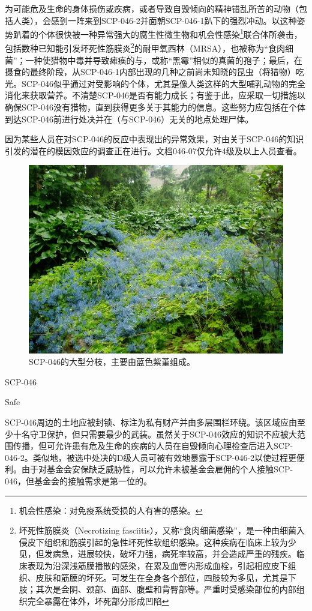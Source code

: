 为可能危及生命的身体损伤或疾病，或者导致自毁倾向的精神错乱所苦的动物（包括人类），会感到一阵来到SCP-046-2并面朝SCP-046-1趴下的强烈冲动。以这种姿势趴着的个体很快被一种异常强大的腐生性微生物和机会性感染\footnote{ 机会性感染：对免疫系统受损的人有害的感染。}联合体所袭击，包括数种已知能引发坏死性筋膜炎\footnote{ 坏死性筋膜炎（Necrotizing fasciitis），又称“食肉细菌感染”，是一种由细菌入侵皮下组织和筋膜引起的急性坏死性软组织感染。这种疾病在临床上较为少见，但发病急，进展较快，破坏力强，病死率较高，并会造成严重的残疾。临床表现为沿深浅筋膜播散的感染，在累及血管内形成血栓，引起相应皮下组织、皮肤和筋膜的坏死。可发生在全身各个部位，四肢较为多见，尤其是下肢；其次是会阴、颈部、面部、腹壁和背臀部等。严重时受感染部位的内部组织完全暴露在体外，坏死部分形成凹陷}的耐甲氧西林（MRSA），也被称为“食肉细菌”；一种使猎物中毒并导致瘫痪的与，或称“黑霉”相似的真菌的孢子；最后，在摄食的最终阶段，从SCP-046-1内部出现的几种之前尚未知晓的昆虫（将猎物）吃光。SCP-046似乎通过对受影响的个体，尤其是像人类这样的大型哺乳动物的完全消化来获取营养。不清楚SCP-046是否有能力成长；有鉴于此，应采取一切措施以确保SCP-046没有猎物，直到获得更多关于其能力的信息。这些努力应包括在个体到达SCP-046前进行处决并在（与SCP-046）无关的地点处理尸体。

 因为某些人员在对SCP-046的反应中表现出的异常效果，对由关于SCP-046的知识引发的潜在的模因效应的调查正在进行。文档046-07仅允许4级及以上人员查看。



\begin{figure}[H]
    \centering
    \includegraphics[width=0.5\linewidth]{images/SCP.046.2.jpg}
    \caption*{SCP-046的大型分枝，主要由蓝色紫堇组成。}
\end{figure}

SCP-046

Safe

SCP-046周边的土地应被封锁、标注为私有财产并由多层围栏环绕。该区域应由至少十名守卫保护，但只需要最少的武装。虽然关于SCP-046效应的知识不应被大范围传播，但可允许患有危及生命的疾病的人员在自毁倾向心理检查后进入SCP-046-2。类似地，被选中处决的D级人员可被有效地暴露于SCP-046-2以使过程更便利。由于对基金会安保缺乏威胁性，可以允许未被基金会雇佣的个人接触SCP-046，但基金会的接触需求是第一位的。

